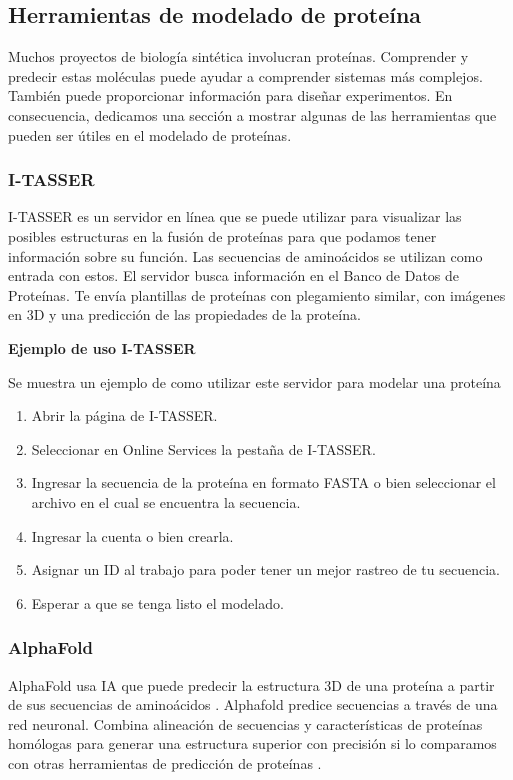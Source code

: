 \documentclass[11pt, letterpaper, spanish]{article}
\begin{document}
{{    \subsection{Herramientas de modelado de proteína}
     \par{Muchos proyectos de biología sintética involucran proteínas. Comprender y predecir estas moléculas puede ayudar a comprender sistemas más complejos. También puede proporcionar información para diseñar experimentos. En consecuencia, dedicamos una sección a mostrar algunas de las herramientas que pueden ser útiles en el modelado de proteínas.}
    \subsubsection{I-TASSER}
        \par{I-TASSER es un servidor en línea que se puede utilizar para visualizar las posibles estructuras en la fusión de proteínas para que podamos tener información sobre su función. Las secuencias de aminoácidos se utilizan como entrada con estos. El servidor busca información en el Banco de Datos de Proteínas. Te envía plantillas de proteínas con plegamiento similar, con imágenes en 3D y una predicción de las propiedades de la proteína.}\\
        \par{\textbf{Ejemplo de uso I-TASSER}}
        \par{Se muestra un ejemplo de como utilizar este servidor para modelar una proteína}
            \begin{enumerate}[1.]
            \item Abrir la página de I-TASSER.
            \item Seleccionar en Online Services la pestaña de I-TASSER.
            \item Ingresar la secuencia de la proteína en formato FASTA o bien seleccionar el archivo en el cual se encuentra la secuencia.
            \item Ingresar la cuenta o bien crearla.
            \item Asignar un ID al trabajo para poder tener un mejor rastreo de tu secuencia.
            \item Esperar a que se tenga listo el modelado.
            \end{enumerate}
        \subsubsection{AlphaFold}
            \par{AlphaFold usa IA que puede predecir la estructura 3D de una proteína a partir de sus secuencias de aminoácidos \cite{Kiersten}. Alphafold predice secuencias a través de una red neuronal. Combina alineación de secuencias y características de proteínas homólogas para generar una estructura superior con precisión si lo comparamos con otras herramientas de predicción de proteínas \cite{DAVID}.}
}}
\end{document}
